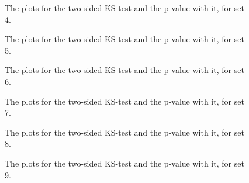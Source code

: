  \begin{figure}
    \centering
    \qquad
    \caption{The plots for the two-sided KS-test and the p-value with it, for set 4.}
  
  \end{figure}
 \begin{figure}
    \centering
    \qquad
    \caption{The plots for the two-sided KS-test and the p-value with it, for set 5.}

  \end{figure}
 \begin{figure}
    \centering
    \qquad
    \caption{The plots for the two-sided KS-test and the p-value with it, for set 6.}
   
  \end{figure}
 \begin{figure}
    \centering
    \qquad
    \caption{The plots for the two-sided KS-test and the p-value with it, for set 7.}

  \end{figure}
 \begin{figure}
    \centering
    \qquad
    \caption{The plots for the two-sided KS-test and the p-value with it, for set 8.}

  \end{figure}
 \begin{figure}
    \centering
    \qquad
    \caption{The plots for the two-sided KS-test and the p-value with it, for set 9.}

  \end{figure}
  
